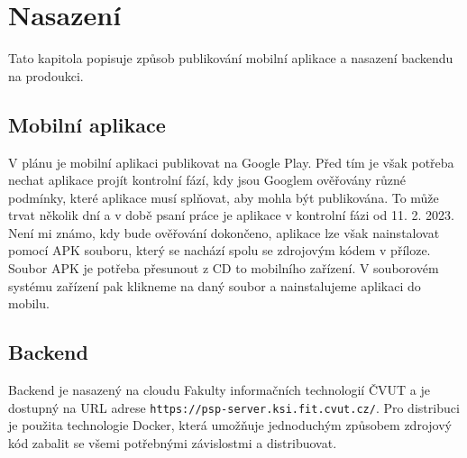 \chapter{Nasazení}
\label{ch:deploy}

\begin{chapterabstract}
	Tato kapitola popisuje způsob publikování mobilní aplikace a nasazení backendu na prodoukci.
\end{chapterabstract}

\section{Mobilní aplikace}
V plánu je mobilní aplikaci publikovat na Google Play. Před tím je však potřeba nechat aplikace projít kontrolní fází, kdy jsou Googlem ověřovány různé podmínky, které aplikace musí splňovat, aby mohla být publikována. To může trvat několik dní a v době psaní práce je aplikace v kontrolní fázi od 11. 2. 2023. Není mi známo, kdy bude ověřování dokončeno, aplikace lze však nainstalovat pomocí APK souboru, který se nachází spolu se zdrojovým kódem v příloze. Soubor APK je potřeba přesunout z CD to mobilního zařízení. V souborovém systému zařízení pak klikneme na daný soubor a nainstalujeme aplikaci do mobilu.

\section{Backend}
Backend je nasazený na cloudu Fakulty informačních technologií ČVUT a je dostupný na URL adrese \texttt{https://psp-server.ksi.fit.cvut.cz/}. Pro distribuci je použita technologie Docker, která umožňuje jednoduchým způsobem zdrojový kód zabalit se všemi potřebnými závislostmi a distribuovat.